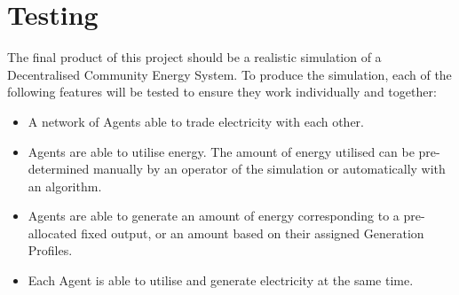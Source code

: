 \chapter{Testing}
\label{Testing}

The final product of this project should be a realistic simulation of a Decentralised Community Energy System. To produce the simulation, each of the following features will be tested to ensure they work individually and together:

\begin{itemize}
\item A network of Agents able to trade electricity with each other.
\item Agents are able to utilise energy. The amount of energy utilised can be pre-determined manually by an operator of the simulation or automatically with an algorithm.
\item Agents are able to generate an amount of energy corresponding to a pre-allocated fixed output, or an amount based on their assigned Generation Profiles.
\item Each Agent is able to utilise and generate electricity at the same time.
\end{itemize}
